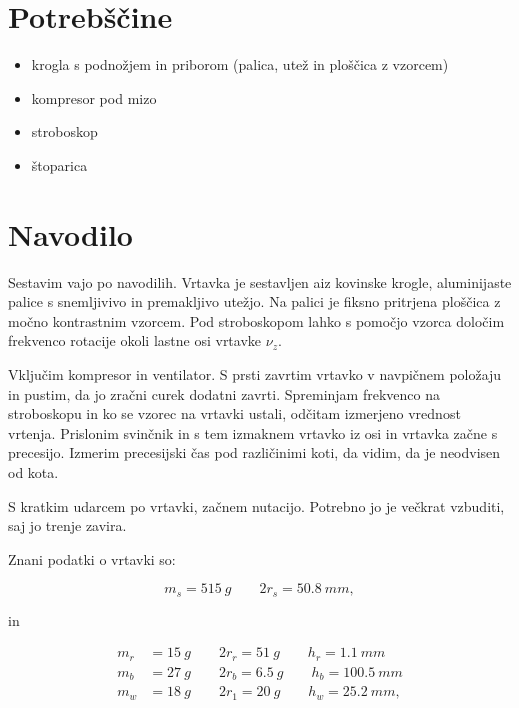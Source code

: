 \documentclass[12pt]{report}
\begin{document}
\begingroup
\let\clearpage\relax

\chapter*{Potrebščine}
\begin{itemize}
\item krogla s podnožjem in priborom (palica, utež in ploščica z vzorcem)
\item kompresor pod mizo 
\item stroboskop
\item štoparica 
\end{itemize}


\chapter*{Navodilo}

Sestavim vajo po navodilih. Vrtavka je sestavljen aiz kovinske krogle, aluminijaste palice s snemljivivo in premakljivo utežjo. Na palici je fiksno pritrjena ploščica z močno kontrastnim vzorcem. Pod stroboskopom lahko s pomočjo vzorca določim frekvenco rotacije okoli lastne osi vrtavke $\nu_z$. 

Vključim kompresor in ventilator. S prsti zavrtim vrtavko v navpičnem položaju in pustim, da jo zračni curek dodatni zavrti. Spreminjam frekvenco na stroboskopu in ko se vzorec na vrtavki ustali, odčitam izmerjeno vrednost vrtenja. Prislonim svinčnik in s tem izmaknem vrtavko iz osi in vrtavka začne s precesijo. Izmerim precesijski čas pod različinimi koti, da vidim, da je neodvisen od kota. 

S kratkim udarcem po vrtavki, začnem nutacijo. Potrebno jo je večkrat vzbuditi, saj jo trenje zavira. 

Znani podatki o vrtavki so: 

\begin{equation*}
  m_s = \SI{515}{g} \qquad 2r_s = \SI{50.8}{mm},
\end{equation*}

in

\begin{align*}
  m_r &= \SI{15}{g} \qquad 2r_r = \SI{51}{g} \qquad h_r = \SI{1.1}{mm} \\
  m_b &= \SI{27}{g} \qquad 2r_b = \SI{6.5}{g} \qquad h_b = \SI{100.5}{mm} \\
  m_w &= \SI{18}{g} \qquad 2r_1 = \SI{20}{g} \qquad h_w = \SI{25.2}{mm},
\end{align*}
\end{document}
